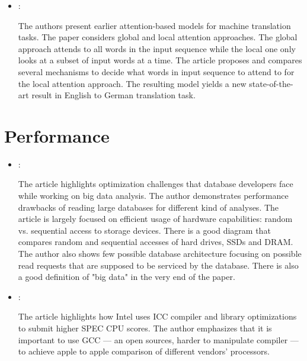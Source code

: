 \begin{itemize}
    \item \cite{Luong:AttentionNMT:2015}:

    The authors present earlier attention-based models for machine translation tasks. The paper considers global and local attention approaches. The global approach attends to all words in the input sequence while the local one only looks at a subset of input words at a time. The article proposes and compares several mechanisms to decide what words in input sequence to attend to for the local attention approach. The resulting model yields a new state-of-the-art result in English to German translation task.
\end{itemize}

\section*{Performance}
\begin{itemize}
    \item \cite{Jacobs:DataBasePerformance:2009}:

    The article highlights optimization challenges that database developers face while working on big data analysis. The author demonstrates performance drawbacks of reading large databases for different kind of analyses. The article is largely focused on efficient usage of hardware capabilities: random vs. sequential access to storage devices. There is a good diagram that compares random and sequential accesses of hard drives, SSDs and DRAM. The author also shows few possible database architecture focusing on possible read requests that are supposed to be serviced by the database. There is also a good definition of "big data" in the very end of the paper.

    \item \cite{Gwennap:IntelHidesBehindICC:2017}:

    The article highlights how Intel uses ICC compiler and library optimizations to submit higher SPEC CPU scores. The author emphasizes that it is important to use GCC --- an open sources, harder to manipulate compiler --- to achieve apple to apple comparison of different vendors' processors.
\end{itemize}


